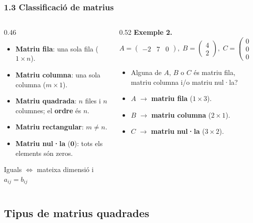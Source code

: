 \documentclass[aspectratio=169]{beamer}
\newcommand{\caixacentrada}[1]{%
  \begin{center}%
    \begin{caixadef}[titular]#1\end{caixadef}%
  \end{center}%
}
\newcommand{\teoriaClassificacioMatrius}{%
  \begin{itemize}
    \item \textbf{Matriu fila}: una sola fila \;($1 \times n$).
    \item \textbf{Matriu columna}: una sola columna \;($m \times 1$).
    \item \textbf{Matriu quadrada}: $n$ files i $n$ columnes; el \textbf{ordre} és $n$.
    \item \textbf{Matriu rectangular}: $m \neq n$.
    \item \textbf{Matriu nul·la} ($\mathbf{0}$): tots els elements són zeros.
  \end{itemize}
  \vspace{0.08cm}
  \caixacentrada{Iguals $\Leftrightarrow$ mateixa dimensió i $a_{ij}=b_{ij}$}%
}
\begin{document}
\begin{frame}[t]
  \frametitle{1.3 Classificació de matrius}

  \vspace{-0.22cm}
  \begin{columns}[T,onlytextwidth]
    \begin{column}{0.46\textwidth}
      \teoriaClassificacioMatrius
    \end{column}

    \begin{column}{0.52\textwidth}
      \textbf{Exemple 2.}
      \[
        A = \begin{pmatrix} -2 & 7 & 0 \end{pmatrix},\;
        B = \begin{pmatrix} 4 \\ 2 \end{pmatrix},\;
        C = \begin{pmatrix} 0 & 0 \\ 0 & 0 \\ 0 & 0 \end{pmatrix}
      \]

      \begin{itemize}
        \item<1-> Alguna de $A$, $B$ o $C$ és matriu fila, matriu columna i/o matriu nul·la?
        \item<2-> $A$ $\rightarrow$ \textcolor{margueVerdFosc}{\textbf{matriu fila}} \;($1 \times 3$).
        \item<3-> $B$ $\rightarrow$ \textcolor{margueVerdFosc}{\textbf{matriu columna}} \;($2 \times 1$).
        \item<4-> $C$ $\rightarrow$ \textcolor{margueVerdFosc}{\textbf{matriu nul·la}} \;($3 \times 2$).
      \end{itemize}
    \end{column}
  \end{columns}
\end{frame}

\subsection{Tipus de matrius quadrades}
\end{document}

